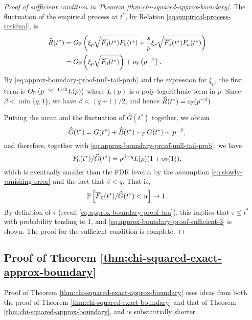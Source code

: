 \begin{proof}[Proof of sufficient condition in Theorem \ref{thm:chi-squared-approx-boundary}]
The fluctuation of the empirical process at $t^*$, by Relation \eqref{eq:empirical-process-residual}, is 
\begin{align*}
    \widehat{R}(t^*) 
    &= O_\P\left(\xi_p\sqrt{\overline{F_0}(t^*)F_0(t^*)} + \frac{s}{p}\xi_s\sqrt{\overline{F_a}(t^*)F_a(t^*)}\right)\\
    &= O_\P\left(\xi_p\sqrt{\overline{F_0}(t^*)}\right) + o_\P\left(p^{-\beta}\right).
\end{align*}
By \eqref{eq:approx-boundary-proof-null-tail-prob} and the expression for $\xi_p$, the first term is $O_\P\left(p^{-(q+1)/2}L(p)\right)$ where $L(p)$ is a poly-logarithmic term in $p$.
Since $\beta<\min\{q,1\}$, we have $\beta<(q+1)/2$, and hence $\widehat{R}(t^*) = o_\P(p^{-\beta})$.

Putting the mean and the fluctuation of $\widehat{G}(t^*)$ together, we obtain
$$
\widehat{G}(t^*) = G(t^*) + \widehat{R}(t^*) \sim_\P G(t^*) \sim p^{-\beta},
$$
and therefore, together with \eqref{eq:approx-boundary-proof-null-tail-prob}, we have
$$
\overline{F_0}(t^*)/\widehat{G}(t^*) = p^{\beta-q}L(p)(1+o_{\P}(1)),
$$
which is eventually smaller than the FDR level $\alpha$ by the assumption \eqref{eq:slowly-vanishing-error} and the fact that $\beta<q$.
That is, 
$$
\P\left[\overline{F}_0(t^*) / \widehat{G}(t^*) < \alpha\right] \to 1.
$$
By definition of $\tau$ (recall \eqref{eq:approx-boundary-proof-tau}), this implies that $\tau \le t^*$ with probability tending to 1, and \eqref{eq:approx-boundary-proof-sufficient-3} is shown.
The proof for the sufficient condition is complete.
\end{proof}

\subsection{Proof of Theorem \ref{thm:chi-squared-exact-approx-boundary}}
\label{subsec:proof-chi-squared-exact-approx-boundary}

Proof of Theorem \ref{thm:chi-squared-exact-approx-boundary} uses ideas from both the proof of Theorem \ref{thm:chi-squared-exact-boundary} and that of Theorem \ref{thm:chi-squared-approx-boundary}, and is substantially shorter.

